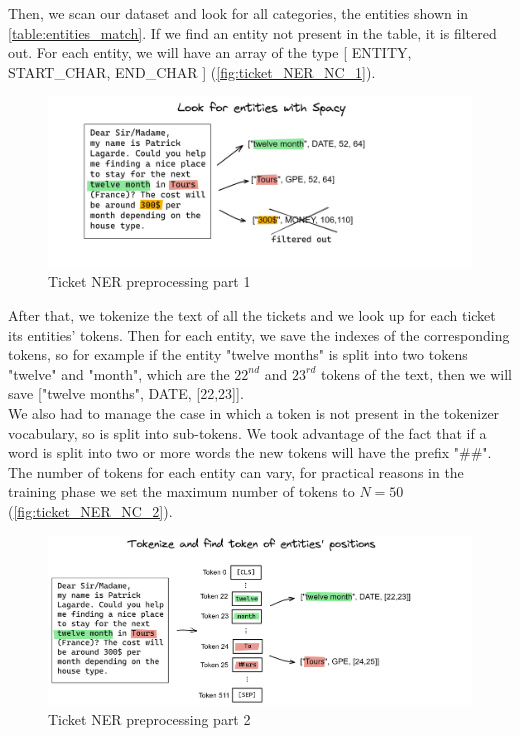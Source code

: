 Then, we scan our dataset and look for all categories, the entities shown in \autoref{table:entities_match}. If we find an entity not present in the table, it is filtered out. For each entity, we will have an array of the type [ ENTITY, START\_CHAR, END\_CHAR ] (\autoref{fig:ticket_NER_NC_1}).\\
\begin{figure}[h] 
    \includegraphics[width=\textwidth]{images/NER_nc_1.png}
    \caption{Ticket NER preprocessing part 1}
    \label{fig:ticket_NER_NC_1}
\end{figure}    
After that, we tokenize the text of all the tickets and we look up for each ticket its entities' tokens. Then for each entity, we save the indexes of the corresponding tokens, so for example if the entity "twelve months" is split into two tokens "twelve" and "month", which are the $22^{nd}$ and $23^{rd}$ tokens of the text, then we will save ["twelve months", DATE, [22,23]]. \\
We also had to manage the case in which a token is not present in the tokenizer vocabulary, so is split into sub-tokens. We took advantage of the fact that if a word is split into two or more words the new tokens will have the prefix "\#\#". \\
The number of tokens for each entity can vary, for practical reasons in the training phase we set the maximum number of tokens to $N=50$ (\autoref{fig:ticket_NER_NC_2}).
\begin{figure}[h] 
    \includegraphics[width=\textwidth]{images/NER_nc_2.png}
    \caption{Ticket NER preprocessing part 2}
    \label{fig:ticket_NER_NC_2}
\end{figure}    

